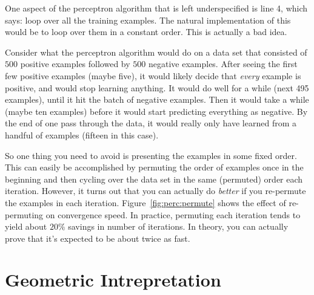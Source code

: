 One aspect of the perceptron algorithm that is left underspecified is
line 4, which says: loop over all the training examples.  The natural
implementation of this would be to loop over them in a constant
order.  This is actually a bad idea.

Consider what the perceptron algorithm would do on a data set that
consisted of $500$ positive examples followed by $500$ negative
examples.  After seeing the first few positive examples (maybe five),
it would likely decide that \emph{every} example is positive, and
would stop learning anything.  It would do well for a while (next 495
examples), until it hit the batch of negative examples.  Then it would
take a while (maybe ten examples) before it would start predicting
everything as negative.  By the end of one pass through the data, it
would really only have learned from a handful of examples (fifteen in
this case).



So one thing you need to avoid is presenting the examples in some
fixed order.  This can easily be accomplished by permuting the order
of examples once in the beginning and then cycling over the data set
in the same (permuted) order each iteration.  However, it turns out
that you can actually do \emph{better} if you re-permute the examples
in each iteration.  Figure~\ref{fig:perc:permute} shows the effect of
re-permuting on convergence speed.  In practice, permuting each
iteration tends to yield about $20\%$ savings in number of iterations.
In theory, you can actually prove that it's expected to be about twice
as fast.


\section{Geometric Intrepretation}

